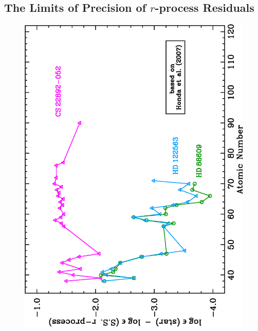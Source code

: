 \documentclass{emulateapj}
\begin{document}
\subsection{The Limits of Precision of $r$-process Residuals}


\begin{figure}
\begin{center}
\includegraphics[angle=270,width=4.5in]{f11a.eps} \\
\vspace*{0.3in}

\end{center}
\end{figure}
\end{document}
